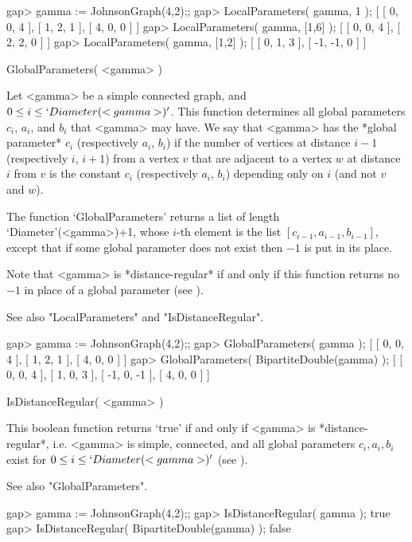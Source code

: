 \beginexample
gap> gamma := JohnsonGraph(4,2);;
gap> LocalParameters( gamma, 1 );
[ [ 0, 0, 4 ], [ 1, 2, 1 ], [ 4, 0, 0 ] ]
gap> LocalParameters( gamma, [1,6] );
[ [ 0, 0, 4 ], [ 2, 2, 0 ] ]
gap> LocalParameters( gamma, [1,2] );
[ [ 0, 1, 3 ], [ -1, -1, 0 ] ]
\endexample


\>GlobalParameters( <gamma> )

Let <gamma> be a simple connected graph, and $0 \le i \le
`Diameter(<gamma>)'$.  This function determines all global parameters
$c_i$, $a_i$, and $b_i$ that <gamma> may have. We say that <gamma> has
the *global parameter* $c_i$ (respectively $a_i$, $b_i$) if the number
of vertices at distance $i-1$ (respectively $i$, $i+1$) from a vertex
$v$ that are adjacent to a vertex $w$ at distance $i$ from $v$ is the
constant $c_i$ (respectively $a_i$, $b_i$) depending only on $i$ (and
not $v$ and $w$).

The function `GlobalParameters' returns a list of length
`Diameter'(<gamma>)+1, whose $i$-th element is the list $[c_{i-1},
a_{i-1}, b_{i-1}]$, except that if some global parameter does not exist
then $-1$ is put in its place.

Note that <gamma> is *distance-regular* if and only if this function
returns no $-1$ in place of a global parameter (see \cite{BCN89}).

See also "LocalParameters" and "IsDistanceRegular".

\beginexample
gap> gamma := JohnsonGraph(4,2);;
gap> GlobalParameters( gamma );
[ [ 0, 0, 4 ], [ 1, 2, 1 ], [ 4, 0, 0 ] ]
gap> GlobalParameters( BipartiteDouble(gamma) );
[ [ 0, 0, 4 ], [ 1, 0, 3 ], [ -1, 0, -1 ], [ 4, 0, 0 ] ]
\endexample


\>IsDistanceRegular( <gamma> )

This boolean function returns `true' if and only if <gamma> is
*distance-regular*, i.e. <gamma> is simple, connected, and all global
parameters $c_i,a_i,b_i$ exist for $0 \le i \le `Diameter(<gamma>)'$
(see \cite{BCN89}).

See also "GlobalParameters".

\beginexample
gap> gamma := JohnsonGraph(4,2);;
gap> IsDistanceRegular( gamma );
true
gap> IsDistanceRegular( BipartiteDouble(gamma) );
false 
\endexample

